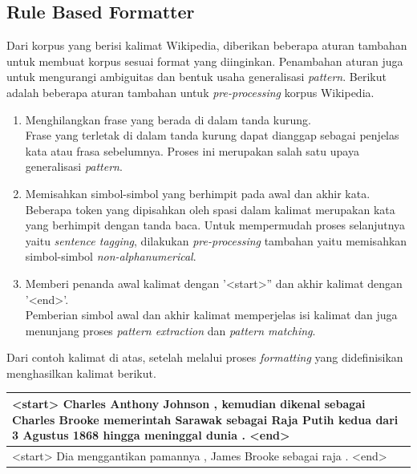 \subsection{Rule Based Formatter}
Dari korpus yang berisi kalimat Wikipedia, diberikan beberapa aturan tambahan untuk membuat korpus sesuai format yang diinginkan. Penambahan aturan juga untuk mengurangi ambiguitas dan bentuk usaha generalisasi \textit{pattern}. Berikut adalah beberapa aturan tambahan untuk \textit{pre-processing} korpus Wikipedia.
\begin{enumerate}
  \item Menghilangkan frase yang berada di dalam tanda kurung. \\
  Frase yang terletak di dalam tanda kurung dapat dianggap sebagai penjelas kata atau frasa sebelumnya. Proses ini merupakan salah satu upaya generalisasi \textit{pattern}.
  \item Memisahkan simbol-simbol yang berhimpit pada awal dan akhir kata. \\
  Beberapa token yang dipisahkan oleh spasi dalam kalimat merupakan kata yang berhimpit dengan tanda baca. Untuk mempermudah proses selanjutnya yaitu \textit{sentence tagging}, dilakukan \textit{pre-processing} tambahan yaitu memisahkan simbol-simbol \textit{non-alphanumerical}.
  \item Memberi penanda awal kalimat dengan '<start>'' dan akhir kalimat dengan '<end>'. \\
  Pemberian simbol awal dan akhir kalimat memperjelas isi kalimat dan juga menunjang proses \textit{pattern extraction} dan \textit{pattern matching}.
\end{enumerate}

\noindent Dari contoh kalimat di atas, setelah melalui proses \textit{formatting} yang didefinisikan menghasilkan kalimat berikut.
\begin{center}
\begin{tabular}{ | m{32em} | } 
\hline
<start> Charles Anthony Johnson , kemudian dikenal sebagai Charles Brooke memerintah Sarawak sebagai Raja Putih kedua dari 3 Agustus 1868 hingga meninggal dunia . <end> \\
\hline 
<start> Dia menggantikan pamannya , James Brooke sebagai raja . <end> \\
\hline
\end{tabular}
\end{center}


